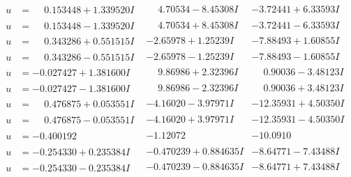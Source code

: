 \documentclass[1p]{elsarticle_modified}
\theoremstyle{definition}
\begin{document}
$$\begin{array}{c|c|c}
\begin{aligned}
u &= \phantom{-}0.153448 + 1.339520 I\end{aligned}
 & \phantom{-}4.70534 - 8.45308 I & -3.72441 + 6.33593 I \\ \hline\begin{aligned}
u &= \phantom{-}0.153448 - 1.339520 I\end{aligned}
 & \phantom{-}4.70534 + 8.45308 I & -3.72441 - 6.33593 I \\ \hline\begin{aligned}
u &= \phantom{-}0.343286 + 0.551515 I\end{aligned}
 & -2.65978 + 1.25239 I & -7.88493 + 1.60855 I \\ \hline\begin{aligned}
u &= \phantom{-}0.343286 - 0.551515 I\end{aligned}
 & -2.65978 - 1.25239 I & -7.88493 - 1.60855 I \\ \hline\begin{aligned}
u &= -0.027427 + 1.381600 I\end{aligned}
 & \phantom{-}9.86986 + 2.32396 I & \phantom{-}0.90036 - 3.48123 I \\ \hline\begin{aligned}
u &= -0.027427 - 1.381600 I\end{aligned}
 & \phantom{-}9.86986 - 2.32396 I & \phantom{-}0.90036 + 3.48123 I \\ \hline\begin{aligned}
u &= \phantom{-}0.476875 + 0.053551 I\end{aligned}
 & -4.16020 - 3.97971 I & -12.35931 + 4.50350 I \\ \hline\begin{aligned}
u &= \phantom{-}0.476875 - 0.053551 I\end{aligned}
 & -4.16020 + 3.97971 I & -12.35931 - 4.50350 I \\ \hline\begin{aligned}
u &= -0.400192\phantom{ +0.000000I}\end{aligned}
 & -1.12072\phantom{ +0.000000I} & -10.0910\phantom{ +0.000000I} \\ \hline\begin{aligned}
u &= -0.254330 + 0.235384 I\end{aligned}
 & -0.470239 + 0.884635 I & -8.64771 - 7.43488 I \\ \hline\begin{aligned}
u &= -0.254330 - 0.235384 I\end{aligned}
 & -0.470239 - 0.884635 I & -8.64771 + 7.43488 I \\ \hline\begin{aligned}

\end{aligned}
\end{array}$$
\end{document}
